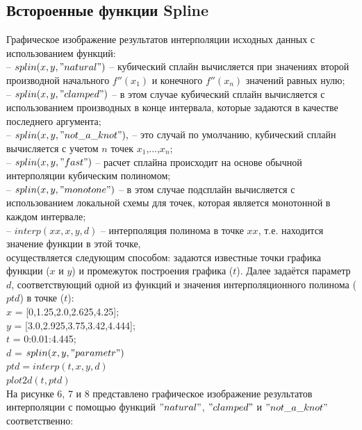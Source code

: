 \documentclass[russian, utf8, nocolumnxxxi, nocolumnxxxii, 14pt]{eskdtext}
\begin{document}
\subsection{Встороенные функции Spline}
Графическое изображение результатов интерполяции исходных данных с использованием функций:\\
\indent -- $splin(x,y,"natural")$ -- кубический сплайн вычисляется при значениях второй производной начального $f''(x_1)$ и конечного $f''(x_n)$ значений равных нулю;\\
\indent -- $splin(x,y,"clamped")$ -- в этом случае кубический сплайн вычисляется с использованием производных в конце интервала, которые задаются в качестве последнего аргумента;\\
\indent -- $splin(x,y,"not\_a\_knot"),$ -- это случай по умолчанию, кубический сплайн вычисляется с учетом $n$ точек $x_1$,...,$x_n$;\\
\indent -- $splin(x,y,"fast")$ -- расчет сплайна происходит на основе обычной интерполяции кубическим полиномом;\\
\indent -- $splin(x,y,"monotone")$ -- в этом случае подсплайн вычисляется с использованием локальной схемы для точек, которая является монотонной в каждом интервале;\\
\indent -- $interp(xx,x,y,d)$ -- интерполяция полинома в точке $xx$, т.е. находится значение функции в этой точке,\\
осуществляется следующим способом: задаются известные точки графика функции ($x$ и $y$) и промежуток построения графика ($t$). Далее задаётся параметр $d$, соответствующий одной из функций и значения интерполяционного полинома ($ptd$) в точке ($t$): \\
$x$ = [0,1.25,2.0,2.625,4.25];\\
$y$ = [3.0,2.925,3.75,3.42,4.444];\\
$t$ = 0:0.01:4.445;\\
$d$ = $splin(x,y,"parametr")$\\
$ptd = interp(t,x,y,d)$\\
$plot2d(t,ptd)$\\
\indent На рисунке 6, 7 и 8 представлено графическое изображение результатов интерполяции с помощью функций $"natural"$, $"clamped"$ и $"not\_a\_knot"$ соответственно:\\
\end{document}
